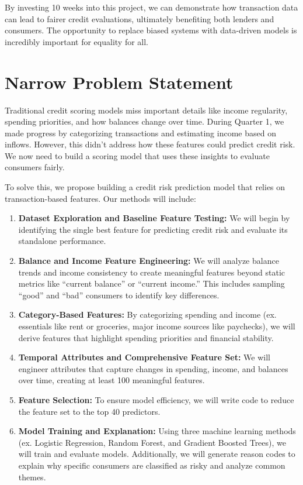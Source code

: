 \documentclass[12pt,letterpaper]{article}
\begin{document}
By investing 10 weeks into this project, we can demonstrate how transaction data can lead to fairer credit evaluations, ultimately benefiting both lenders and consumers. The opportunity to replace biased systems with data-driven models is incredibly important for equality for all.


\section{Narrow Problem Statement}
Traditional credit scoring models miss important details like income regularity, spending priorities, and how balances change over time. During Quarter 1, we made progress by categorizing transactions and estimating income based on inflows. However, this didn’t address how these features could predict credit risk. We now need to build a scoring model that uses these insights to evaluate consumers fairly.

To solve this, we propose building a credit risk prediction model that relies on transaction-based features. Our methods will include:
\begin{enumerate}
    \item \textbf{Dataset Exploration and Baseline Feature Testing:} We will begin by identifying the single best feature for predicting credit risk and evaluate its standalone performance.
    \item \textbf{Balance and Income Feature Engineering:} We will analyze balance trends and income consistency to create meaningful features beyond static metrics like “current balance” or “current income.” This includes sampling “good” and “bad” consumers to identify key differences.
    \item \textbf{Category-Based Features:} By categorizing spending and income (ex. essentials like rent or groceries, major income sources like paychecks), we will derive features that highlight spending priorities and financial stability.
    \item \textbf{Temporal Attributes and Comprehensive Feature Set:} We will engineer attributes that capture changes in spending, income, and balances over time, creating at least 100 meaningful features.
    \item \textbf{Feature Selection:} To ensure model efficiency, we will write code to reduce the feature set to the top 40 predictors.
    \item \textbf{Model Training and Explanation:} Using three machine learning methods (ex. Logistic Regression, Random Forest, and Gradient Boosted Trees), we will train and evaluate models. Additionally, we will generate reason codes to explain why specific consumers are classified as risky and analyze common themes.
\end{enumerate}
\end{document}
